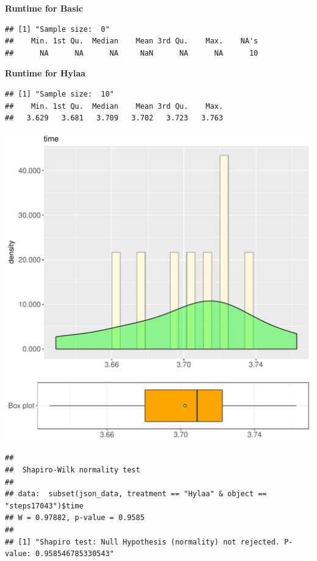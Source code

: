 \documentclass{article}\usepackage[]{graphicx}\usepackage[]{color}
\makeatletter
\def\maxwidth{ %
  \ifdim\Gin@nat@width>\linewidth
    \linewidth
  \else
    \Gin@nat@width
  \fi
}
\newenvironment{kframe}{%
 \def\at@end@of@kframe{}%
 \ifinner\ifhmode%
  \def\at@end@of@kframe{\end{minipage}}%
  \begin{minipage}{\columnwidth}%
 \fi\fi%
 \def\FrameCommand##1{\hskip\@totalleftmargin \hskip-\fboxsep
 \colorbox{shadecolor}{##1}\hskip-\fboxsep
     \hskip-\linewidth \hskip-\@totalleftmargin \hskip\columnwidth}%
 \MakeFramed {\advance\hsize-\width
   \@totalleftmargin\z@ \linewidth\hsize
   \@setminipage}}%
 {\par\unskip\endMakeFramed%
 \at@end@of@kframe}
\newenvironment{knitrout}{}{} %
\makeatother
\begin{document}
 \textbf{Runtime for Basic}
\begin{knitrout}
\color{fgcolor}\begin{kframe}
\begin{verbatim}
## [1] "Sample size:  0"
##    Min. 1st Qu.  Median    Mean 3rd Qu.    Max.    NA's 
##      NA      NA      NA     NaN      NA      NA      10
\end{verbatim}
\end{kframe}
\end{knitrout}
 \textbf{Runtime for Hylaa}
\begin{knitrout}
\color{fgcolor}\begin{kframe}
\begin{verbatim}
## [1] "Sample size:  10"
##    Min. 1st Qu.  Median    Mean 3rd Qu.    Max. 
##   3.629   3.681   3.709   3.702   3.723   3.763
\end{verbatim}
\end{kframe}
\includegraphics[width=\maxwidth]{figure/RH3_Hylaa_steps17043-1} 
\begin{kframe}\begin{verbatim}
## 
## 	Shapiro-Wilk normality test
## 
## data:  subset(json_data, treatment == "Hylaa" & object == "steps17043")$time
## W = 0.97882, p-value = 0.9585
## 
## [1] "Shapiro test: Null Hypothesis (normality) not rejected. P-value: 0.958546785330543"
\end{verbatim}
\end{kframe}
\end{knitrout}
  
\end{document}
